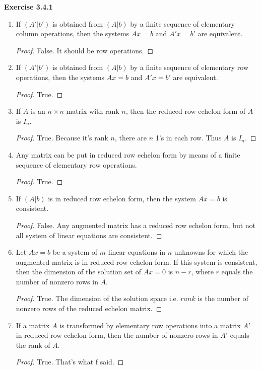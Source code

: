 \documentclass[12pt, a4paper]{article}
\theoremstyle{plain}
\newenvironment{exercise}[2][Exercise]
    { \begin{mdframed}[backgroundcolor=gray!20] \textbf{#1 #2} \\}
    {  \end{mdframed}}
\begin{document}
\begin{exercise}{3.4.1}
\hfill
	\begin{enumerate}[label=(\alph*)]
	\item If $(A'|b')$ is obtained from $(A|b)$ by a finite sequence of elementary column operations, then the systems $Ax=b$ and $A'x=b'$ are equivalent.
		\begin{proof}
		False. It should be row operations.
		\end{proof}
	\item If $(A'|b')$ is obtained from $(A|b)$ by a finite sequence of elementary row operations, then the systems $Ax=b$ and $A'x=b'$ are equivalent.
		\begin{proof}
		True.
		\end{proof}
	\item If $A$ is an $n\times n$ matrix with rank $n$, then the reduced row echelon form of $A$ is $I_n$.
		\begin{proof}
		True. Because it's rank $n$, there are $n$ 1's in each row. Thus $A$ is $I_n$.
		\end{proof}
	\item Any matrix can be put in reduced row echelon form by means of a finite sequence of elementary row operations.
		\begin{proof}
		True.
		\end{proof}
	\item If $(A|b)$ is in reduced row echelon form, then the system $Ax=b$ is consistent.
		\begin{proof}
		False. Any augmented matrix has a reduced row echelon form, but not all system of linear equations are consistent.
		\end{proof}
	\item Let $Ax=b$ be a system of $m$ linear equations in $n$ unknowns for which the augmented matrix is in reduced row echelon form. If this system is consistent, then the dimension of the solution set of $Ax=0$ is $n-r$, where $r$ equals the number of nonzero rows in $A$.
		\begin{proof}
		True. The dimension of the solution space i.e. $rank$ is the number of nonzero rows of the reduced echelon matrix.
		\end{proof}
	\item If a matrix $A$ is transformed by elementary row operations into a matrix $A'$ in reduced row echelon form, then the number of nonzero rows in $A'$ equals the rank of $A$.
		\begin{proof}
		True. That's what f said.
		\end{proof}
	\end{enumerate}
\end{exercise}
\end{document}
